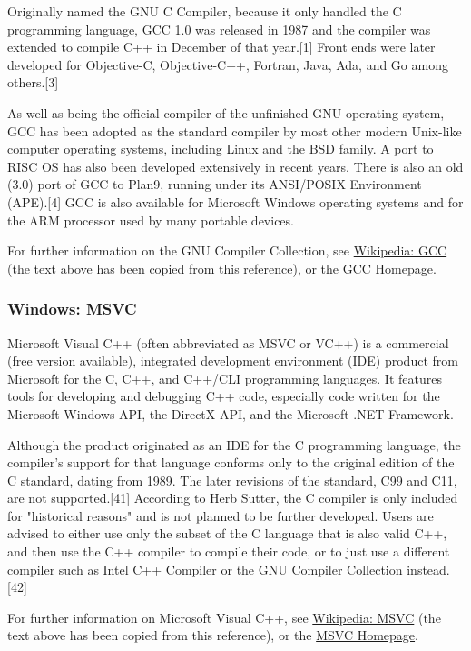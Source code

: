 \vpara
Originally named the GNU C Compiler, because it only handled the C programming language, GCC 1.0 was released in 1987 and the compiler was extended to compile C++ in December of that year.[1] Front ends were later developed for Objective-C, Objective-C++, Fortran, Java, Ada, and Go among others.[3]

\vpara
As well as being the official compiler of the unfinished GNU operating system, GCC has been adopted as the standard compiler by most other modern Unix-like computer operating systems, including Linux and the BSD family. A port to RISC OS has also been developed extensively in recent years. There is also an old (3.0) port of GCC to Plan9, running under its ANSI/POSIX Environment (APE).[4] GCC is also available for Microsoft Windows operating systems and for the ARM processor used by many portable devices.

\vpara
For further information on the GNU Compiler Collection, see \href{http://en.wikipedia.org/wiki/GNU_Compiler_Collection}{Wikipedia: GCC} (the text above has been copied from this reference), or the  \href{http://gcc.gnu.org/}{GCC Homepage}.


\subsubsection{Windows: MSVC}
Microsoft Visual C++ (often abbreviated as MSVC or VC++) is a commercial (free version available), integrated development environment (IDE) product from Microsoft for the C, C++, and C++/CLI programming languages. It features tools for developing and debugging C++ code, especially code written for the Microsoft Windows API, the DirectX API, and the Microsoft .NET Framework.

\vpara
Although the product originated as an IDE for the C programming language, the compiler's support for that language conforms only to the original edition of the C standard, dating from 1989. The later revisions of the standard, C99 and C11, are not supported.[41] According to Herb Sutter, the C compiler is only included for "historical reasons" and is not planned to be further developed. Users are advised to either use only the subset of the C language that is also valid C++, and then use the C++ compiler to compile their code, or to just use a different compiler such as Intel C++ Compiler or the GNU Compiler Collection instead.[42]

\vpara
For further information on Microsoft Visual C++, see \href{http://en.wikipedia.org/wiki/Visual_C\%2B\%2B}{Wikipedia: MSVC} (the text above has been copied from this reference), or the  \href{http://msdn.microsoft.com/en-us/vstudio/hh386302}{MSVC Homepage}.


